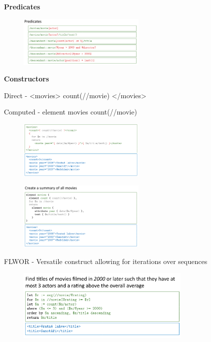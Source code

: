 \textbf{Predicates}
\begin{figure}[ht!]
\centering
\includegraphics[width=0.55\textwidth]{oborove/DS2/img/pred.png}
\end{figure}

\textbf{Constructors}

Direct - <movies>{ count(//movie) }</movies>

Computed - element movies { count(//movie) }

\begin{figure}[ht!]
\centering
\includegraphics[width=0.55\textwidth]{oborove/DS2/img/direct.png}
\end{figure}
\begin{figure}[ht!]
\centering
\includegraphics[width=0.55\textwidth]{oborove/DS2/img/computed.png}
\end{figure}

\pagebreak

FLWOR - Versatile construct allowing for iterations over sequences
\begin{figure}[ht!]
\centering
\includegraphics[width=0.75\textwidth]{oborove/DS2/img/flwor.png}
\end{figure}

